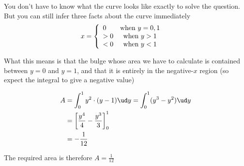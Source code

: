 \begin{solution}[\halfpage]
  You don't have to know what the curve looks like exactly to solve the question. 
  But you can still infer three facts about the curve immediately
  \begin{align}
      x &= \left\lbrace
              \begin{array}{l c}
                 0 & \text{when }y=0,1 \\
                 > 0 & \text{when }y > 1 \\
                 < 0 & \text{when }y < 1
              \end{array}\right.
  \end{align}
  
  What this means is that the bulge whose area we have to calculate is 
  contained between $y=0$ and $y=1$, and that it is entirely in the 
  negative-$x$ region (so expect the integral to give a negative value)
  
  \begin{align}
     A &= \int_0^1 y^2\cdot(y-1)\ud y = \int_0^1(y^3-y^2)\ud y \\
       &= \left[ \dfrac{y^4}{4} - \dfrac{y^3}{3}\right]_0^1 \\
       &= -\dfrac{1}{12}
  \end{align}
  
  The required area is therefore $A = \frac{1}{12}$
\end{solution}
